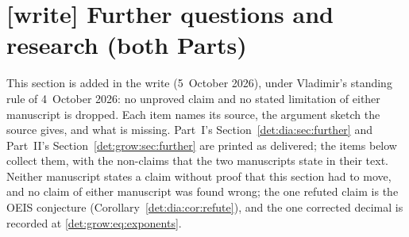 \documentclass[11pt,letterpaper]{article}
\numberwithin{equation}{section}
\theoremstyle{definition}\newtheorem{definition}[theorem]{Definition}
\theoremstyle{remark}\newtheorem{remark}[theorem]{Remark}
\newcommand{\wtag}{\textup{\textbf{[write]}}}
\begin{document}
\section{\texorpdfstring{\wtag}{[write]} Further questions and research (both Parts)}\label{det:sec:further}
This section is added in the write (5~October 2026), under Vladimir's standing rule of 4~October 2026: no unproved claim and no stated limitation of either manuscript is dropped. Each item names its source, the argument sketch the source gives, and what is missing. Part~I's Section~\ref{det:dia:sec:further} and Part~II's Section~\ref{det:grow:sec:further} are printed as delivered; the items below collect them, with the non-claims that the two manuscripts state in their text. Neither manuscript states a claim without proof that this section had to move, and no claim of either manuscript was found wrong; the one refuted claim is the OEIS conjecture (Corollary~\ref{det:dia:cor:refute}), and the one corrected decimal is recorded at \eqref{det:grow:eq:exponents}.
\end{document}
